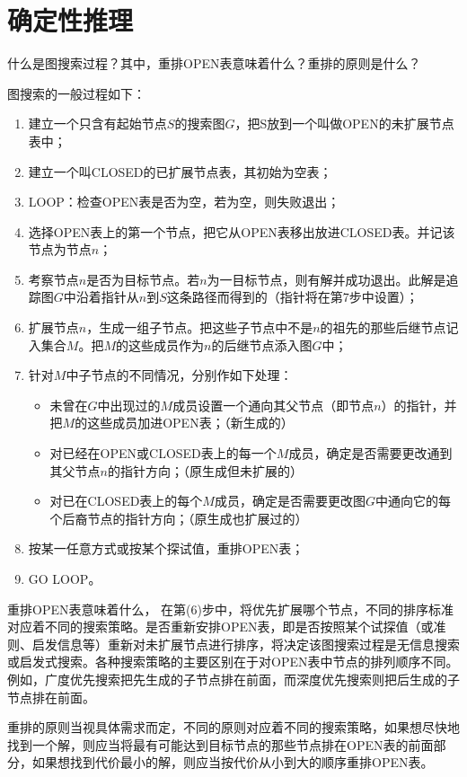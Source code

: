 \chapter{确定性推理}

\begin{question}
什么是图搜索过程？其中，重排OPEN表意味着什么？重排的原则是什么？
\end{question}	
\begin{solution}
图搜索的一般过程如下：
	\begin{enumerate}
		\item 建立一个只含有起始节点$S$的搜索图$G$，把S放到一个叫做OPEN的未扩展节点表中；
		\item 建立一个叫CLOSED的已扩展节点表，其初始为空表；
		\item LOOP：检查OPEN表是否为空，若为空，则失败退出；
		\item 选择OPEN表上的第一个节点，把它从OPEN表移出放进CLOSED表。并记该节点为节点$n$；
		\item 考察节点$n$是否为目标节点。若$n$为一目标节点，则有解并成功退出。此解是追踪图$G$中沿着指针从$n$到$S$这条路径而得到的（指针将在第7步中设置）；
		\item 扩展节点$n$，生成一组子节点。把这些子节点中不是$n$的祖先的那些后继节点记入集合$M$。把$M$的这些成员作为$n$的后继节点添入图$G$中；
		\item 针对$M$中子节点的不同情况，分别作如下处理：
			\begin{itemize}
				\item 未曾在$G$中出现过的$M$成员设置一个通向其父节点（即节点$n$）的指针，并把$M$的这些成员加进OPEN表；（新生成的）
				\item 对已经在OPEN或CLOSED表上的每一个$M$成员，确定是否需要更改通到其父节点$n$的指针方向；（原生成但未扩展的）
				\item 对已在CLOSED表上的每个$M$成员，确定是否需要更改图$G$中通向它的每个后裔节点的指针方向；（原生成也扩展过的）
			\end{itemize}
		\item 按某一任意方式或按某个探试值，重排OPEN表；
		\item GO LOOP。
	\end{enumerate} \par
重排OPEN表意味着什么， 在第(6)步中，将优先扩展哪个节点，不同的排序标准对应着不同的搜索策略。是否重新安排OPEN表，即是否按照某个试探值（或准则、启发信息等）重新对未扩展节点进行排序，将决定该图搜索过程是无信息搜索或启发式搜索。各种搜索策略的主要区别在于对OPEN表中节点的排列顺序不同。例如，广度优先搜索把先生成的子节点排在前面，而深度优先搜索则把后生成的子节点排在前面。\par
重排的原则当视具体需求而定，不同的原则对应着不同的搜索策略，如果想尽快地找到一个解，则应当将最有可能达到目标节点的那些节点排在OPEN表的前面部分，如果想找到代价最小的解，则应当按代价从小到大的顺序重排OPEN表。
\end{solution}

